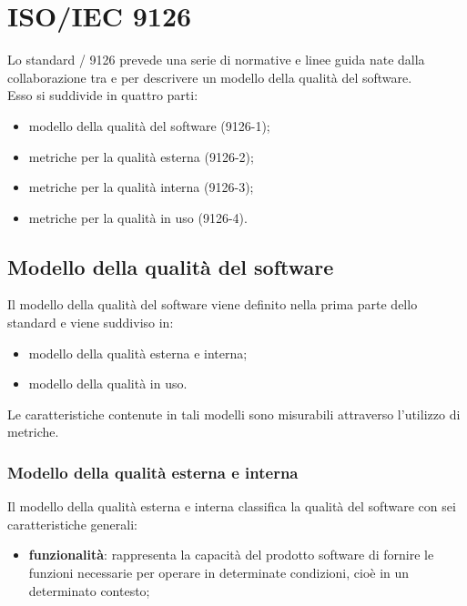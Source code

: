 
{
\newcommand{\qmodel}{modello della qualità del software}
\newcommand{\qeimodel}{modello della qualità esterna e interna}
\newcommand{\qumodel}{modello della qualità in uso}
\newcommand{\Qmodel}{Modello della qualità del software}
\newcommand{\Qeimodel}{Modello della qualità esterna e interna}
\newcommand{\Qumodel}{Modello della qualità in uso}
\newcommand{\rappr}{rappresenta la capacità del prodotto software}

\section{ISO/IEC 9126}

Lo standard / 9126 prevede una serie di normative e linee guida nate dalla collaborazione tra  e  per descrivere un modello della qualità del software. \\
Esso si suddivide in quattro parti:
	\begin{itemize}	
		\item modello della qualità del software (9126-1);
		\item metriche per la qualità esterna (9126-2);
		\item metriche per la qualità interna (9126-3);
		\item metriche per la qualità in uso (9126-4).
	\end{itemize}

\subsection{\Qmodel}
	Il {\qmodel} viene definito nella prima parte dello standard e viene suddiviso in:
	\begin{itemize}
		\item \qeimodel;
		\item \qumodel.
	\end{itemize}
	Le caratteristiche contenute in tali modelli sono misurabili attraverso l'utilizzo di metriche. \\
	
\subsubsection{\Qeimodel}
	Il {\qeimodel} classifica la qualità del software con sei caratteristiche generali:
	\begin{itemize}
		\item \textbf{funzionalità}: {\rappr} di fornire le funzioni necessarie per operare in determinate condizioni, cioè in un determinato contesto;
		

\end{itemize}}
